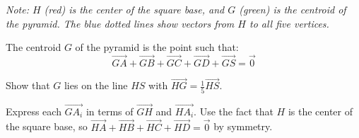 \begin{problem}
\textit{Note: $H$ (red) is the center of the square base, and $G$ (green) is the centroid of the pyramid. The blue dotted lines show vectors from $H$ to all five vertices.}

The centroid $G$ of the pyramid is the point such that:
$$\overrightarrow{GA} + \overrightarrow{GB} + \overrightarrow{GC} + \overrightarrow{GD} + \overrightarrow{GS} = \vec{0}$$

Show that $G$ lies on the line $HS$ with $\overrightarrow{HG} = \frac{1}{5}\overrightarrow{HS}$.
\end{problem}

\begin{hint}
Express each $\overrightarrow{GA_i}$ in terms of $\overrightarrow{GH}$ and $\overrightarrow{HA_i}$. Use the fact that $H$ is the center of the square base, so $\overrightarrow{HA} + \overrightarrow{HB} + \overrightarrow{HC} + \overrightarrow{HD} = \vec{0}$ by symmetry.
\end{hint}

